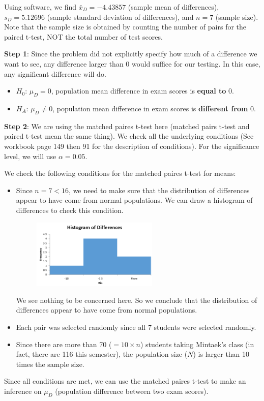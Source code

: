\documentclass[12pt]{article}
\begin{document}
Using software, we find $\bar{x}_D = -4.43857$ (sample mean of differences), ${s_D = 5.12696}$ (sample standard deviation of differences), and $n = 7$ (sample size). Note that the sample size is obtained by counting the number of pairs for the paired t-test, NOT the total number of test scores.

\noindent \textbf{Step 1}: Since the problem did not explicitly specify how much of a difference we want to see, any difference larger than 0 would suffice for our testing. In this case, any significant difference will do.
\begin{itemize}
	\item $H_0$: $\mu_D = 0$, population mean difference in exam scores is \textbf{equal to} 0.
	\item $H_A$: $\mu_D \neq 0$, population mean difference in exam scores is \textbf{different from} 0.
\end{itemize}

\noindent \textbf{Step 2}: We are using the matched paires t-test here (matched pairs t-test and paired t-test mean the same thing). We check all the underlying conditions (See workbook page 149 then 91 for the description of conditions). For the significance level, we will use $\alpha = 0.05$.

We check the following conditions for the matched paires t-test for means:
\vspace{-10 pt}
\begin{itemize}
	\item Since $n = 7 < 16$, we need to make sure that the distribution of differences appear to have come from normal populations. We can draw a histogram of differences to check this condition.
	
	\begin{figure}[!h]
		\centering
		\vspace{-10 pt}
		\includegraphics[width=6cm]{Figures/fig1.png}
		\vspace{-10 pt}
	\end{figure}
	
	We see nothing to be concerned here. So we conclude that the distribution of differences appear to have come from normal populations.
	\item Each pair was selected randomly since all 7 students were selected randomly.
	\item Since there are more than 70 ($= 10 \times n$) students taking Mintaek's class (in fact, there are 116 this semester), the population size ($N$) is larger than 10 times the sample size.
\end{itemize}
Since all conditions are met, we can use the matched paires t-test to make an inference on $\mu_D$ (population difference between two exam scores).
\end{document}
